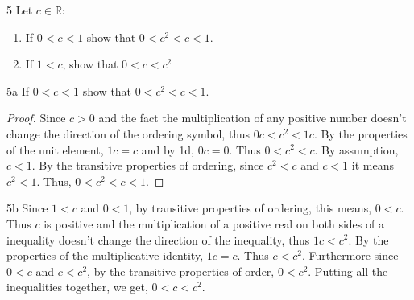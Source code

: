 \documentclass{article}
\newcommand{\R}{\mathbb{R}}
\begin{document}
\begin{PROB}{5}\label{Problem 5.}
    Let $c \in \R$:

    \begin{enumerate}
        \item If $0 < c < 1$ show that $0 < c^2 < c < 1$. 
        \item If $1 < c$, show that $0 < c < c^2$  
    \end{enumerate}
\end{PROB}
\begin{claim}{5a}\label{Claim 5a.}
    If $0 < c < 1$ show that $0 < c^2 < c < 1$.
\end{claim}
\begin{proof}
    Since $c > 0$ and the fact the multiplication of any positive number doesn't change the direction of the ordering symbol, thus $0c < c^2 < 1c$. By the properties of the unit element, $1c = c$ and by 1d, $0c = 0$. Thus $0 < c^2 < c$. By assumption, $c < 1$. By the transitive properties of ordering, since $c^2 < c$ and $c < 1$ it means $c^2 < 1$. Thus, $0 < c^2 < c <1$.   
\end{proof}
\begin{claim}{5b}\label{Claim 5b.}
    Since $1 < c$ and $0 < 1$, by transitive properties of ordering, this means, $0 < c$. Thus $c$ is positive and the multiplication of a positive real on both sides of a inequality doesn't change the direction of the inequality, thus $1c < c^2$. By the properties of the multiplicative identity, $1c = c$. Thus $c < c^2$. Furthermore since $0 < c$ and $c < c^2$, by the transitive properties of order, $0 < c^2$. Putting all the inequalities together, we get, $0 < c < c^2$.          
\end{claim}

\bigskip
\end{document}
